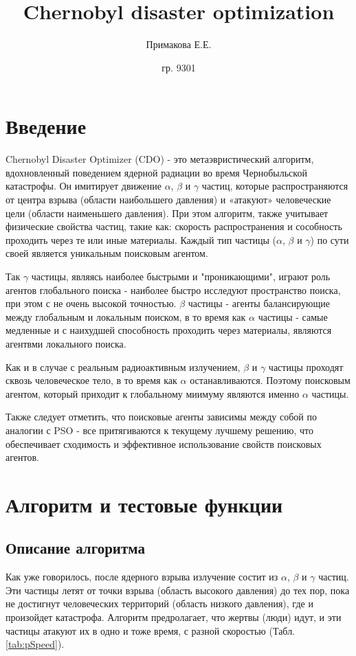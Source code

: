 \documentclass[10pt]{article}
\title{Chernobyl disaster optimization}
\author{Примакова Е.Е.}
\date{гр. 9301}
\begin{document}
\maketitle

\section{Введение}
Chernobyl Disaster Optimizer (CDO) - это метаэвристический алгоритм, вдохновленный поведением ядерной радиации во время Чернобыльской катастрофы. Он имитирует движение $\alpha$, $\beta$ и $\gamma$ частиц, которые распространяются от центра взрыва (области наибольшего давления) и «атакуют» человеческие цели (области наименьшего давления).
При этом алгоритм, также учитывает физические свойства частиц, такие как: скорость распространения и сособность проходить через те или иные материалы.
Каждый тип частицы ($\alpha$, $\beta$ и $\gamma$) по сути своей является уникальным поисковым агентом. 

Так $\gamma$ частицы, являясь наиболее быстрыми и "проникающими", играют роль агентов глобального поиска - наиболее быстро исследуют пространство поиска, при этом с не очень высокой точностью. $\beta$ частицы - агенты балансирующие между глобальным и локальным поиском, в то время как $\alpha$ частицы - самые медленные и с наихудшей способность проходить через материалы, являются агентвми локального поиска.

Как и в случае с реальным радиоактивным излучением, $\beta$ и $\gamma$ частицы проходят сквозь человеческое тело, в то время как $\alpha$ останавливаются. Поэтому поисковым агентом, который приходит к глобальному миимуму являются именно $\alpha$ частицы.

Также следует отметить, что поисковые агенты зависимы между собой по аналогии с PSO - все притягиваются к текущему лучшему решению, что обеспечивает сходимость и эффективное использование свойств поисковых агентов.
\section{Алгоритм и тестовые функции}

\subsection{Описание алгоритма}
Как уже говорилось, после ядерного взрыва излучение состит из $\alpha$, $\beta$ и $\gamma$ частиц. Эти частицы летят от точки взрыва (область высокого давления) до тех пор, пока не достигнут человеческих территорий (область низкого давления), где и произойдет катастрофа. Алгоритм предролагает, что жертвы (люди) идут, и эти частицы атакуют их в одно и тоже время, с разной скоростью (Табл. \ref{tab:pSpeed}).  
\end{document}
